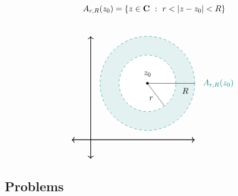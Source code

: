 \begin{discussion}
\begin{itemize}[itemsep=1em]
\[A_{r,R}(z_0) = \left\{z\in \mathbf C\ :\ r < \left\lvert z-z_0\right\rvert<R\right\}\]\\[-1em]
\[\begin{tikzpicture}[scale=0.8]
    \draw[<->,thick] (-1,0)--(5.5,0);
	\draw[<->,thick] (0,-1)--(0,5.5);
	\filldraw[teal,fill opacity=1/10,dashed](3,3) circle (2.5);
	\fill[white](3,3) circle (1.5);
    \draw[teal,dashed](3,3) circle (1.5);
    \draw[](3,3)--(5.5,3);
    \draw[](3,3)--(3.9,1.8);
    \fill (3,3) circle (2pt);
    \node[] at (3,3.5) {$z_0$};
    \node[] at (6.75,3) {\color{teal}$A_{r,R}(z_0)$};
    \node[] at (5,2.6) {$R$};
    \node[] at (3.2,2.2) {$r$};
  \end{tikzpicture}\]
\end{itemize}
\end{discussion}


\subsection{Problems}
\vspace{0.1in}

